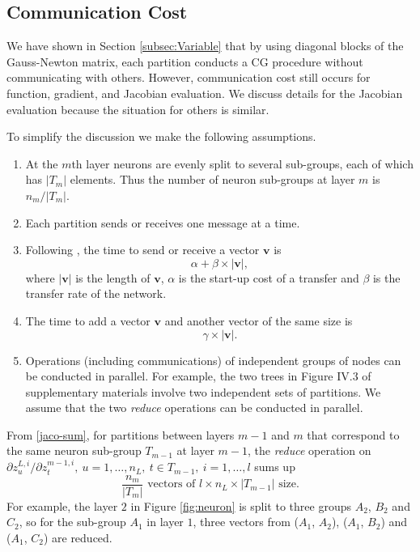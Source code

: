 \documentclass[12pt]{article}
\def\bv{{\boldsymbol v}}
\begin{document}
\subsection{Communication Cost}
\label{subsec:Communi-cost}
We have shown in Section \ref{subsec:Variable} that by using diagonal blocks of the Gauss-Newton matrix, each partition conducts a CG procedure without
communicating with others. However, communication cost still occurs for function, gradient, and Jacobian evaluation. We discuss details for the Jacobian
evaluation because the situation for others is similar.

To simplify the discussion we make the following assumptions.
\begin{enumerate}[1.]
\item At the $m$th layer neurons are evenly split to several sub-groups, each of which has $|T_m|$ elements.
Thus the number of neuron sub-groups at layer $m$ is $n_m/|T_m|$. 
\item Each partition sends or receives one message at a time.
\item Following \cite{MB94a}, the time to send or receive a vector $\bv$ is
\begin{equation*}
\alpha + \beta \times |\bv|,
\end{equation*}
where $|\bv|$ is the length of $\bv$, $\alpha$ is the start-up cost of a transfer and $\beta$ is the transfer rate of the network.
\item The time to add a vector $\bv$ and another vector of the same size is
\begin{equation*}
\gamma \times |\bv|.
\end{equation*}
\item
Operations (including communications) of independent groups of nodes can be conducted in parallel.
For example, the two trees in Figure IV.3 of supplementary materials involve two independent sets of partitions. 
We assume that the two {\it reduce} operations can be conducted in parallel.
\end{enumerate}
From \eqref{jaco-sum}, for partitions between layers $m-1$ and $m$ that correspond to the same neuron sub-group $T_{m-1}$
at layer $m-1$, the {\it reduce} operation on $\partial z^{L,i}_u/\partial z^{m-1,i}_t,\ u=1,\ldots,n_L,\ t \in T_{m-1},\ i=1,\ldots,l$ sums up
\begin{equation*}
\frac{n_m}{|T_m|} \text{ vectors of } l \times n_L \times |T_{m-1}| \text{ size.}
\end{equation*} 
For example, the layer $2$ in Figure \ref{fig:neuron} is split to three groups $A_2$, $B_2$ and $C_2$, so for the sub-group $A_1$ in layer $1$, three vectors from ($A_1$, $A_2$), ($A_1$, $B_2$) and ($A_1$, $C_2$) are reduced. 
\end{document}
